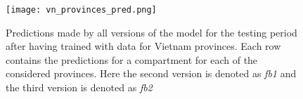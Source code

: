 \begin{figure}[!htb]
    \centering
    \texttt{[image: vn\_provinces\_pred.png]}
    \caption{Predictions made by all versions of the model for the testing period after having trained with data for Vietnam provinces. Each row contains the predictions for a compartment for each of the considered provinces. Here the second version is denoted as \textit{fb1} and the third version is denoted as \textit{fb2}}
    \label{fig:pred-vn-provinces}
\end{figure}
